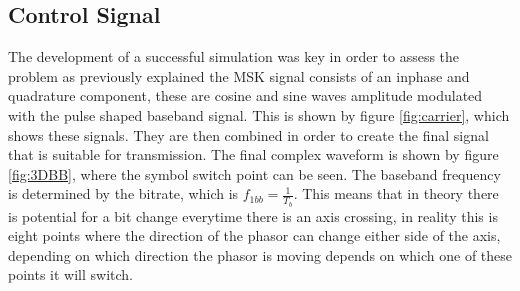 \subsection{Control Signal}
The development of a successful simulation was key in order to assess the problem as previously explained the MSK signal consists of an inphase and quadrature component, these are cosine and sine waves amplitude modulated with the pulse shaped baseband signal. This is shown by figure \ref{fig:carrier}, which shows these signals. They are then combined in order to create the final signal that is suitable for transmission. The final complex waveform is shown by figure \ref{fig:3DBB}, where the symbol switch point can be seen. The baseband frequency is determined by the bitrate, which is $f_{1bb} = \frac{1}{T_b}$. This means that in theory there is potential for a bit change everytime there is an axis crossing, in reality this is eight points where the direction of the phasor can change either side of the axis, depending on which direction the phasor is moving depends on which one of these points it will switch.

